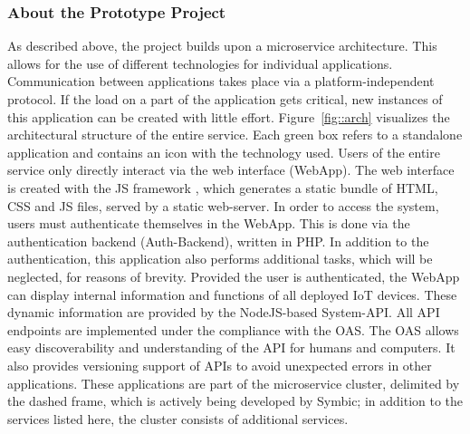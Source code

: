         \subsubsection{About the Prototype Project}\label{ssec::project}
        
        \noindent As described above, the project builds upon a microservice architecture. This allows for the use of different technologies for individual applications. Communication between applications takes place via a platform-independent protocol. If the load on a part of the application gets critical, new instances of this application can be created with little effort.\newline
        Figure~\ref{fig::arch} visualizes the architectural structure of the entire service. Each green box refers to a standalone application and contains an icon with the technology used. Users of the entire service only directly interact via the web interface (WebApp). The web interface is created with the \ac{JS} framework , which generates a static bundle of HTML, CSS and \ac{JS} files, served by a static web-server. In order to access the system, users must authenticate themselves in the WebApp. This is done via the authentication backend (Auth-Backend), written in PHP. In addition to the authentication, this application also performs additional tasks, which will be neglected, for reasons of brevity. Provided the user is authenticated, the WebApp can display internal information and functions of all deployed \ac{IoT} devices. These dynamic information are provided by the NodeJS-based System-\ac{API}. All \ac{API} endpoints are implemented under the compliance with the \ac{OAS}. The \ac{OAS} allows easy discoverability and understanding of the \ac{API} for humans and computers. It also provides versioning support of \ac{API}s to avoid unexpected errors in other applications. These applications are part of the microservice cluster, delimited by the dashed frame, which is actively being developed by Symbic; in addition to the services listed here, the cluster consists of additional services.\newline
